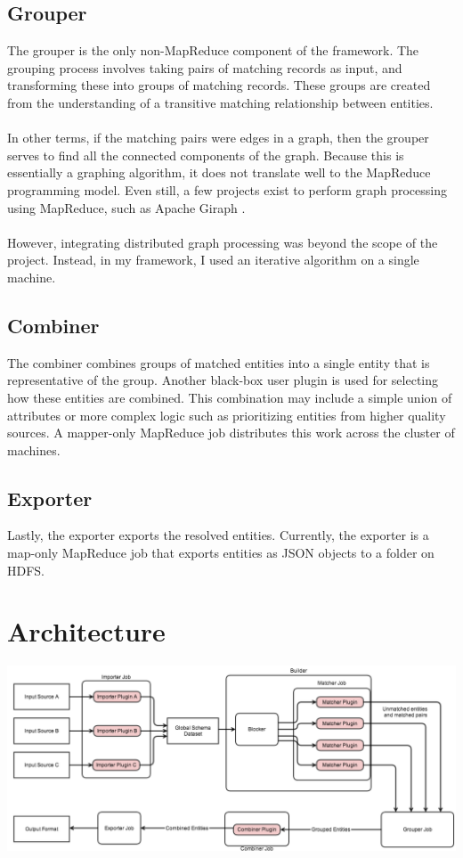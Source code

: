 \documentclass[12pt]{article}
\begin{document}
\subsection{Grouper}
The grouper is the only non-MapReduce component of the framework. 
The grouping process involves taking pairs of matching records as input, and transforming these into groups of matching records. 
These groups are created from the understanding of a transitive matching relationship between entities.\\\\
In other terms, if the matching pairs were edges in a graph, then the grouper serves to find all the connected components of the graph.
Because this is essentially a graphing algorithm, it does not translate well to the MapReduce programming model.
Even still, a few projects exist to perform graph processing using MapReduce, such as Apache Giraph \cite{giraph}.\\\\
However, integrating distributed graph processing was beyond the scope of the project. 
Instead, in my framework, I used an iterative algorithm on a single machine.
\subsection{Combiner}
The combiner combines groups of matched entities into a single entity that is representative of the group.
Another black-box user plugin is used for selecting how these entities are combined.
This combination may include a simple union of attributes or more complex logic such as prioritizing entities from higher quality sources.
A mapper-only MapReduce job distributes this work across the cluster of machines.
\subsection{Exporter}
Lastly, the exporter exports the resolved entities. Currently, the exporter is a map-only MapReduce job that exports entities as JSON objects to a folder on HDFS.



\section{Architecture}
\centerline{\includegraphics[scale=.5]{architecture}}
\end{document}
